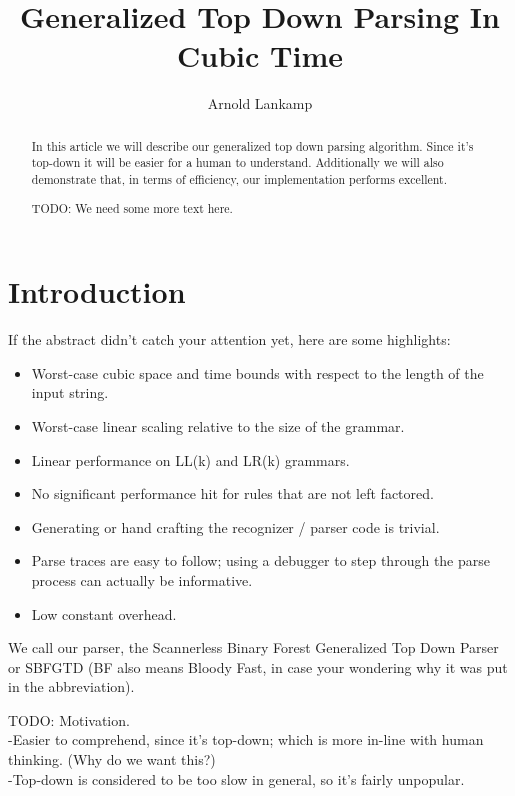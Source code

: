 \documentclass[a4paper,10pt]{article}
\title{Generalized Top Down Parsing In Cubic Time}
\author{Arnold Lankamp}
\begin{document}
\maketitle

\begin{abstract}

In this article we will describe our generalized top down parsing algorithm. Since it's top-down it will be easier for a human to understand. Additionally we will also demonstrate that, in terms of efficiency, our implementation performs excellent.

TODO: We need some more text here.

\end{abstract}

\section{Introduction}

If the abstract didn't catch your attention yet, here are some highlights:
\begin{itemize}
 \setlength{\itemsep}{0pt}
 \setlength{\parskip}{0pt}
 \setlength{\parsep}{0pt}

 \item Worst-case cubic space and time bounds with respect to the length of the input string.
 \item Worst-case linear scaling relative to the size of the grammar.
 \item Linear performance on LL(k) and LR(k) grammars.
 \item No significant performance hit for rules that are not left factored.
 \item Generating or hand crafting the recognizer / parser code is trivial.
 \item Parse traces are easy to follow; using a debugger to step through the parse process can actually be informative.
 \item Low constant overhead.
\end{itemize}
We call our parser, the Scannerless Binary Forest Generalized Top Down Parser or SBFGTD (BF also means Bloody Fast, in case your wondering why it was put in the abbreviation).

TODO: Motivation.\\
-Easier to comprehend, since it's top-down; which is more in-line with human thinking. (Why do we want this?)\\
-Top-down is considered to be too slow in general, so it's fairly unpopular.
\end{document}
